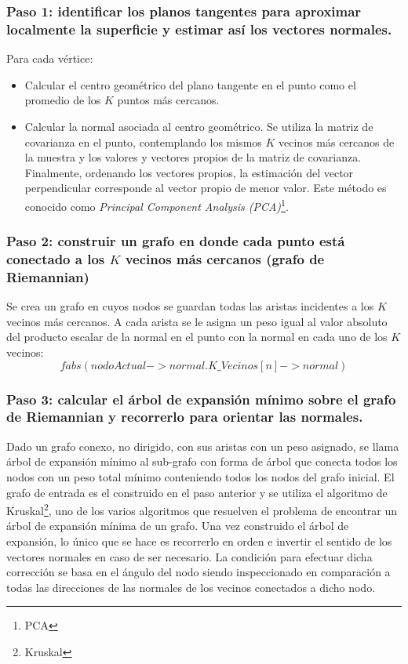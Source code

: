 \subsubsection{Paso 1: identificar los planos tangentes para aproximar localmente la superficie y estimar así los vectores normales.}
Para cada vértice:
	\begin{itemize}
		\item Calcular el centro geométrico del plano tangente en el punto como el promedio de los $K$ puntos más cercanos.
		\item Calcular la normal asociada al centro geométrico. Se utiliza la matriz de covarianza en el punto, contemplando los mismos $K$ vecinos más cercanos de la muestra y los valores y vectores propios de la matriz de covarianza. Finalmente, ordenando los vectores propios, la estimación del vector perpendicular corresponde al vector propio de menor valor. Este método es conocido como \emph{Principal Component Analysis (PCA)}\footnote{PCA}.
	\end{itemize}

\subsubsection{Paso 2: construir un grafo en donde cada punto está conectado a los $K$ vecinos más cercanos (grafo de Riemannian)}
Se crea un grafo en cuyos nodos se guardan todas las aristas incidentes a los $K$ vecinos más cercanos. A cada arista se le asigna un peso igual al valor absoluto del producto escalar de la normal en el punto con la normal en cada uno de los $K$ vecinos:
   $$fabs(nodoActual->normal . K\_Vecinos[n]->normal)$$
\subsubsection{Paso 3: calcular el árbol de expansión mínimo sobre el grafo de Riemannian y recorrerlo para orientar las normales.}
Dado un grafo conexo, no dirigido, con sus aristas con un peso asignado, se llama árbol de expansión mínimo al sub-grafo con forma de árbol que conecta todos los nodos con un peso total mínimo conteniendo todos los nodos del grafo inicial. El grafo de entrada es el construido en el paso anterior y se utiliza el algoritmo de Kruskal\footnote{Kruskal}, uno de los varios algoritmos que resuelven el problema de encontrar un árbol de expansión mínima de un grafo.
Una vez construido el árbol de expansión, lo único que se hace es recorrerlo en orden e invertir el sentido de los vectores normales en caso de ser necesario. La condición para efectuar dicha corrección se basa en el ángulo del nodo siendo inspeccionado en comparación a todas las direcciones de las normales de los vecinos conectados a dicho nodo.

